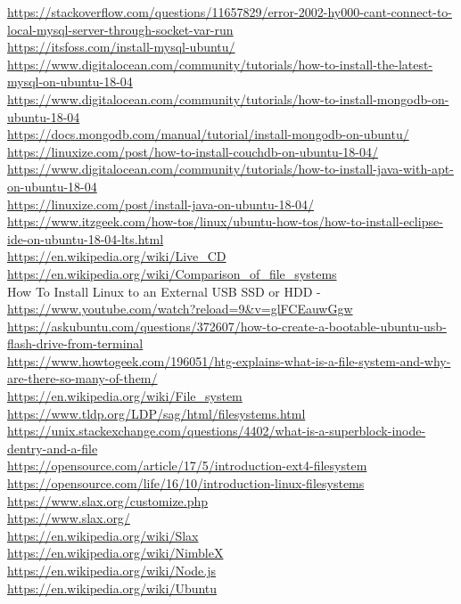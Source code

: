 \documentclass[12pt,vi]{mitthesis}
\begin{document}
\url{https://stackoverflow.com/questions/11657829/error-2002-hy000-cant-connect-to-local-mysql-server-through-socket-var-run}\\
\url{https://itsfoss.com/install-mysql-ubuntu/}\\
\url{https://www.digitalocean.com/community/tutorials/how-to-install-the-latest-mysql-on-ubuntu-18-04}\\
\url{https://www.digitalocean.com/community/tutorials/how-to-install-mongodb-on-ubuntu-18-04}\\
\url{https://docs.mongodb.com/manual/tutorial/install-mongodb-on-ubuntu/}\\
\url{https://linuxize.com/post/how-to-install-couchdb-on-ubuntu-18-04/}\\
\url{https://www.digitalocean.com/community/tutorials/how-to-install-java-with-apt-on-ubuntu-18-04}\\
\url{https://linuxize.com/post/install-java-on-ubuntu-18-04/}\\
\url{https://www.itzgeek.com/how-tos/linux/ubuntu-how-tos/how-to-install-eclipse-ide-on-ubuntu-18-04-lts.html}\\
\url{https://en.wikipedia.org/wiki/Live_CD}\\
\url{https://en.wikipedia.org/wiki/Comparison_of_file_systems}\\
How To Install Linux to an External USB SSD or HDD - \url{https://www.youtube.com/watch?reload=9&v=glFCEauwGgw}\\
\url{https://askubuntu.com/questions/372607/how-to-create-a-bootable-ubuntu-usb-flash-drive-from-terminal}\\
\url{https://www.howtogeek.com/196051/htg-explains-what-is-a-file-system-and-why-are-there-so-many-of-them/}\\
\url{https://en.wikipedia.org/wiki/File_system}\\
\url{https://www.tldp.org/LDP/sag/html/filesystems.html}\\
\url{https://unix.stackexchange.com/questions/4402/what-is-a-superblock-inode-dentry-and-a-file}\\
\url{https://opensource.com/article/17/5/introduction-ext4-filesystem}\\
\url{https://opensource.com/life/16/10/introduction-linux-filesystems}\\
\url{https://www.slax.org/customize.php}\\
\url{https://www.slax.org/}\\
\url{https://en.wikipedia.org/wiki/Slax}\\
\url{https://en.wikipedia.org/wiki/NimbleX}\\
\url{https://en.wikipedia.org/wiki/Node.js}\\
\url{https://en.wikipedia.org/wiki/Ubuntu}\\
\end{document}
